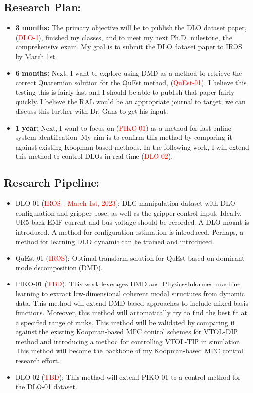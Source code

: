 \documentclass[11pt]{article}
\begin{document}
\subsection{Research Plan:}
\begin{itemize}
  \item \textbf{3 months:} The primary objective will be to publish the DLO dataset paper,
  (\textcolor{red}{DLO-1}),
  finished my classes, and to meet my next Ph.D. milestone, the comprehensive exam.
  My goal is to submit the DLO dataset paper to IROS by March 1st.\
  \item \textbf{6 months:} Next, I want to explore using DMD as a method to retrieve the
  correct Quaternion solution for the QuEst method, (\textcolor{red}{QuEst-01}).
  I believe this testing this
  is fairly fast and I should be able to publish that paper fairly quickly. I
  believe the RAL would be an appropriate journal to target; we can discuss
  this further with Dr. Gans to get his input.\
  \item \textbf{1 year:} Next, I want to focus on (\textcolor{red}{PIKO-01}) as a method
  for fast online system identification. My aim is to confirm this method by
  comparing it against existing Koopman-based methods. In the following work, I
  will extend this method to control DLOs in real time (\textcolor{red}{DLO-02}).\
\end{itemize}

\subsection{Research Pipeline:}
\begin{itemize}
  \item DLO-01 (\textcolor{red}{IROS - March 1st, 2023}):
  DLO manipulation dataset with DLO configuration and gripper pose, as well
  as the gripper control input. Ideally, UR5 back-EMF current and bus voltage
  should be recorded. A DLO mount is introduced. A method for configuration
  estimation is introduced. Perhaps, a method for learning DLO dynamic can be
  trained and introduced.\
  \item QuEst-01 (\textcolor{red}{IROS}):
  Optimal transform solution for QuEst based on dominant mode decomposition (DMD).
  \item PIKO-01 (\textcolor{red}{TBD}):
  This work leverages DMD and Physics-Informed machine learning to extract
  low-dimensional coherent modal structures from dynamic data. This method
  will extend DMD-based approaches to include mixed basis functions. Moreover,
  this method will automatically try to find the best fit at a specified range
  of ranks. This method will be validated by comparing it against the existing
  Koopman-based MPC control schemes for VTOL-DIP method and introducing a method
  for controlling VTOL-TIP in simulation.
  This method will become the backbone of my Koopman-based MPC
  control research effort.\
  \item DLO-02 (\textcolor{red}{TBD}):
  This method will extend PIKO-01 to a control method for the DLO-01 dataset.

\end{itemize}
  \newpage

\newpage


\end{document}
